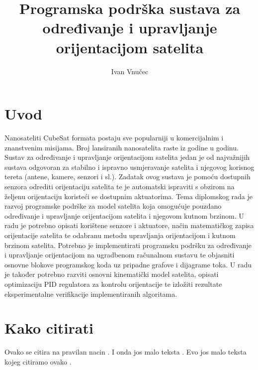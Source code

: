 \documentclass[times, utf8, diplomski, numeric]{templates/template}
\begin{document}

\title{Programska podrška sustava za određivanje i upravljanje orijentacijom satelita}


\author{Ivan Vnučec}

\maketitle

\izvornik


\tableofcontents

\chapter{Uvod}
Nanosateliti CubeSat formata postaju sve popularniji u komercijalnim i znanstvenim misijama. Broj lansiranih nanosatelita raste iz godine u godinu. Sustav za određivanje i upravljanje orijentacijom satelita jedan je od najvažnijih sustava odgovoran za stabilno i ispravno usmjeravanje satelita i njegovog korisnog tereta (antene, kamere, senzori i sl.). Zadatak ovog sustava je pomoću dostupnih senzora odrediti orijentaciju satelita te je automatski ispraviti s obzirom na željenu orijentaciju koristeći se dostupnim aktuatorima. Tema diplomskog rada je razvoj programske podrške za model satelita koja omogućuje pouzdano određivanje i upravljanje orijentacijom satelita i njegovom kutnom brzinom. U radu je potrebno opisati korištene senzore i aktuatore, način matematičkog zapisa orijentacije satelita te odabranu metodu upravljanja orijentacijom i kutnom brzinom satelita. Potrebno je implementirati programsku podršku za određivanje i upravljanje orijentacijom na ugradbenom računalnom sustavu te objasniti osnovne blokove programskog koda uz pripadne grafove i dijagrame toka. U radu je također potrebno razviti osnovni kinematički model satelita, opisati optimizaciju PID regulatora za kontrolu orijentacije te izložiti rezultate eksperimentalne verifikacije implementiranih algoritama.

\chapter{Kako citirati}
Ovako se citira na pravilan nacin \cite{oetiket2007lshort}. I onda jos malo teksta \cite{downes2002shortams}. 
Evo jos malo teksta kojeg citiramo ovako \cite{ungar2002uvod}.
\end{document}
